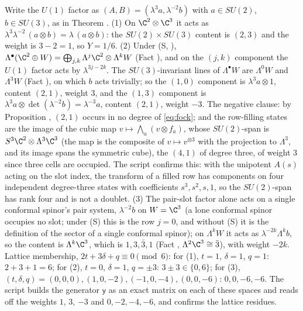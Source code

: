 Write the $U(1)$ factor as $(A, B) = (\lambda^{3}a, \lambda^{-2}b)$ with $a \in SU(2)$, $b \in SU(3)$, as in Theorem . (1) On $\C^{2} \otimes \C^{3}$ it acts as $\lambda^{3}\lambda^{-2}\,(a \otimes b) = \lambda\,(a \otimes b)$: the $SU(2) \times SU(3)$ content is $(2,3)$ and the weight is $3 - 2 = 1$, so $Y = 1/6$. (2) Under (S, ), $\Lambda^{\bullet}(\C^{2} \oplus W) = \bigoplus_{j,k}\Lambda^{j}\C^{2} \otimes \Lambda^{k}W$ (Fact ), and on the $(j, k)$ component the $U(1)$ factor acts by $\lambda^{3j - 2k}$. The $SU(3)$-invariant lines of $\Lambda^{\bullet}W$ are $\Lambda^{0}W$ and $\Lambda^{3}W$ (Fact ), on which $b$ acts trivially; so the $(1, 0)$ component is $\lambda^{3}a \otimes 1$, content $(2,1)$, weight $3$, and the $(1, 3)$ component is $\lambda^{3}a \otimes \det(\lambda^{-2}b) = \lambda^{-3}a$, content $(2,1)$, weight $-3$. The negative clause: by Proposition , $(2,1)$ occurs in no degree of \eqref{eq:fock}; and the row-filling states are the image of the cubic map $v \mapsto \bigwedge_{a}(v \otimes f_{a})$, whose $SU(2)$-span is $S^{3}\C^{2} \otimes \Lambda^{3}\C^{3}$ (the map is the composite of $v \mapsto v^{\otimes 3}$ with the projection to $\Lambda^{3}$, and its image spans the symmetric cube), the $(4,1)$ of degree three, of weight $3$ since three cells are occupied. The script confirms this: with the unipotent $A(s)$ acting on the slot index, the transform of a filled row has components on four independent degree-three states with coefficients $s^{3}, s^{2}, s, 1$, so the $SU(2)$-span has rank four and is not a doublet. (3) The pair-slot factor alone acts on a single conformal spinor's pair system, $\lambda^{-2}b$ on $W = \C^{3}$ (a lone conformal spinor occupies no slot; under (S) this is the row $j = 0$, and without (S) it is the definition of the sector of a single conformal spinor); on $\Lambda^{k}W$ it acts as $\lambda^{-2k}\Lambda^{k}b$, so the content is $\Lambda^{k}\C^{3}$, which is $1, 3, \bar{3}, 1$ (Fact , $\Lambda^{2}\C^{3} \cong \bar{3}$), with weight $-2k$. Lattice membership, $2t + 3\delta + q \equiv 0 \pmod 6$: for (1), $t = 1$, $\delta = 1$, $q = 1$: $2 + 3 + 1 = 6$; for (2), $t = 0$, $\delta = 1$, $q = \pm 3$: $3 \pm 3 \in \{0, 6\}$; for (3), $(t, \delta, q) = (0, 0, 0), (1, 0, -2), (-1, 0, -4), (0, 0, -6)$: $0, 0, -6, -6$. The script builds the generator $\mathsf{y}$ as an exact matrix on each of these spaces and reads off the weights $1$, $3$, $-3$ and $0, -2, -4, -6$, and confirms the lattice residues.
